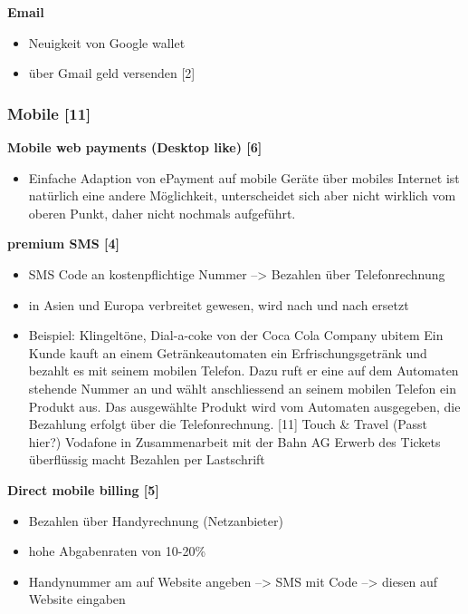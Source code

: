 \textbf{ Email}\\
        \begin{itemize}
        \item Neuigkeit von Google wallet
        \item über Gmail geld versenden [2]
        \end{itemize}


\subsubsection{ Mobile [11]}
\textbf{ Mobile web payments (Desktop like) [6]}\\
        \begin{itemize}
        \item Einfache Adaption von ePayment auf mobile Geräte über mobiles Internet ist natürlich eine andere Möglichkeit, unterscheidet sich aber nicht wirklich vom oberen Punkt, daher nicht nochmals aufgeführt.
        \end{itemize}

\textbf{ premium SMS [4]}\\
        \begin{itemize}
        \item SMS Code an kostenpflichtige Nummer --> Bezahlen über Telefonrechnung
        \item in Asien und Europa verbreitet gewesen, wird nach und nach ersetzt
        \item Beispiel:
        \subitem  Klingeltöne,
        \subitem  Dial-a-coke von der Coca Cola Company
ubitem  Ein Kunde kauft an einem Getränkeautomaten ein Erfrischungsgetränk und bezahlt es mit seinem mobilen Telefon. Dazu ruft er eine auf dem Automaten stehende Nummer an und wählt anschliessend an seinem mobilen Telefon ein Produkt aus. Das ausgewählte Produkt wird vom Automaten ausgegeben, die Bezahlung erfolgt über die Telefonrechnung. [11]
        \subitem  Touch \& Travel (Passt hier?)
                \subitem  Vodafone in Zusammenarbeit mit der Bahn AG
                \subitem  Erwerb des Tickets überflüssig macht
                \subitem  Bezahlen per Lastschrift
        \end{itemize}


\textbf{ Direct mobile billing [5]}\\
        \begin{itemize}
        \item Bezahlen über Handyrechnung (Netzanbieter)
        \item hohe Abgabenraten von 10-20\%
        \item Handynummer am auf Website angeben --> SMS mit Code --> diesen auf Website eingaben
        \end{itemize}



